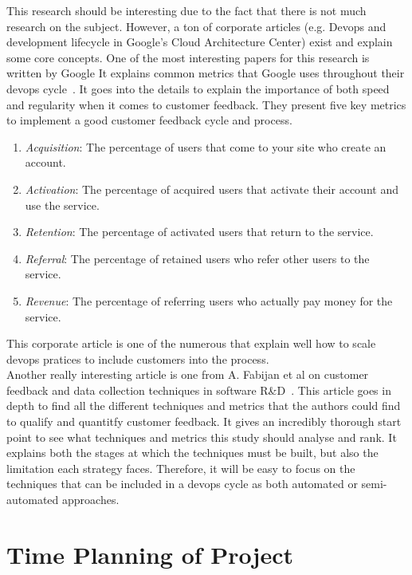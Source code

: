 \documentclass[10pt, conference]{IEEEtran}
\begin{document}
This research should be interesting due to the fact that there is not much research 
on the subject.
However, a ton of corporate articles (e.g. Devops and development lifecycle in 
Google's Cloud Architecture Center) exist and explain some core concepts. 
One of the most interesting papers for this research is written by Google
It explains common metrics that Google uses throughout their devops cycle~\cite{DORA}. 
It goes into the details to explain the importance of both speed and 
regularity when it comes to customer feedback. They present five key metrics to  
implement a good customer feedback cycle and process.
\begin{enumerate}
  \item \emph{Acquisition}: The percentage of users that come to your site who 
    create an account.
  \item \emph{Activation}: The percentage of acquired users that activate their 
    account and use the service.
  \item \emph{Retention}: The percentage of activated users that return to the service.
  \item \emph{Referral}: The percentage of retained users who refer other users to the service.
  \item \emph{Revenue}: The percentage of referring users who actually pay money for the service.
\end{enumerate}
This corporate article is one of the numerous that explain well how to scale 
devops pratices to include customers into the process.\\


Another really interesting article is one from A. Fabijan et al on customer 
feedback and data collection techniques in software R\&D~\cite{fabijan-olsson-15}. 
This article goes in depth to find all the different techniques and metrics 
that the authors could find to qualify and quantitfy customer feedback. 
It gives an incredibly thorough start point to see what techniques and metrics 
this study should analyse and rank.
It explains both the stages at which the techniques must be built, but also the 
limitation each strategy faces.
Therefore, it will be easy to focus on the techniques that can be included in 
a devops cycle as both automated or semi-automated approaches.

\section{Time Planning of Project}
\label{sec:schedule}
\end{document}
